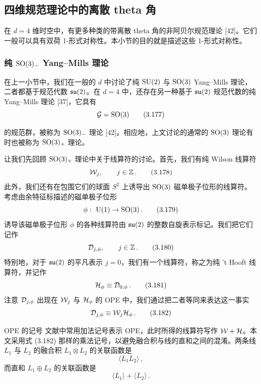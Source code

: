 \subsection{四维规范理论中的离散 theta 角}

在 $d=4$ 维时空中，有更多种类的带离散 theta 角的非阿贝尔规范理论 [42]。它们一般可以具有双荷 1-形式对称性。本小节的目的就是描述这些 1-形式对称性。

\subsubsection{纯 $\mathrm{SO}(3)_-$ Yang--Mills 理论}

在上一小节中，我们在一般的 $d$ 中讨论了纯 $\mathrm{SU}(2)$ 与 $\mathrm{SO}(3)$ Yang--Mills 理论，二者都基于规范代数 $\mathfrak{su}(2)$。在 $d=4$ 中，还存在另一种基于 $\mathfrak{su}(2)$ 规范代数的纯 Yang--Mills 理论 [37]，它具有
\begin{equation}
    \mathcal{G} = \mathrm{SO}(3)
    \tag{3.177}
\end{equation}


的规范群，被称为 $\mathrm{SO}(3)_-$ 理论 [42]。相应地，上文讨论的通常的 $\mathrm{SO}(3)$ 理论有时也被称为 $\mathrm{SO}(3)_+$ 理论。

让我们先回顾 $\mathrm{SO}(3)_+$ 理论中关于线算符的讨论。首先，我们有纯 Wilson 线算符
\begin{equation}
    \mathcal{W}_j ,\qquad j \in \mathbb{Z} \,.
    \tag{3.178}
\end{equation}
此外，我们还有在包围它们的球面 $S^2$ 上诱导出 $\mathrm{SO}(3)$ 磁单极子位形的线算符。考虑由余特征标描述的磁单极子位形
\begin{equation}
    \phi:\ \mathrm{U}(1) \to \mathrm{SO}(3) \,.
    \tag{3.179}
\end{equation}
诱导该磁单极子位形 $\phi$ 的各种线算符由 $\mathfrak{su}(2)$ 的整数自旋表示标记。我们把它们记作
\begin{equation}
    \mathcal{D}_{j,\phi} ,\qquad j \in \mathbb{Z} \,.
    \tag{3.180}
\end{equation}
特别地，对于 $\mathfrak{su}(2)$ 的平凡表示 $j=0$，我们有一个线算符，称之为纯 't Hooft 线算符，并记作
\begin{equation}
    \mathcal{H}_\phi \equiv \mathcal{D}_{0,\phi} \,.
    \tag{3.181}
\end{equation}
注意 $\mathcal{D}_{j,\phi}$ 出现在 $\mathcal{W}_j$ 与 $\mathcal{H}_\phi$ 的 OPE 中，我们通过把二者等同来表达这一事实
\begin{equation}
    \mathcal{D}_{j,\phi} \equiv \mathcal{W}_j \mathcal{H}_\phi \,.
    \tag{3.182}
\end{equation}

\begin{notebox}{OPE 的记号}
文献中常用加法记号表示 OPE，此时所得的线算符写作 $\mathcal{W} + \mathcal{H}$。本文采用式 (3.182) 那样的乘法记号，以避免融合积与线的直和之间的混淆。两条线 $L_1$ 与 $L_2$ 的融合积 $L_1 \otimes L_2$ 的关联函数是
\begin{equation}
    \langle L_1 L_2 \rangle \,,
    \tag{3.183}
\end{equation}
而直和 $L_1 \oplus L_2$ 的关联函数是
\begin{equation}
    \langle L_1 \rangle + \langle L_2 \rangle \,.
    \tag{3.184}
\end{equation}
\end{notebox}

